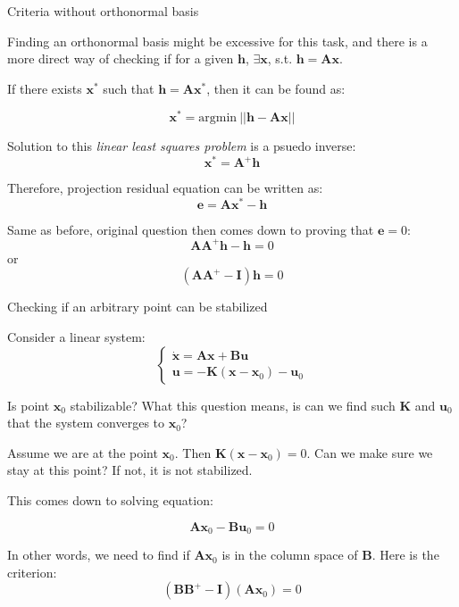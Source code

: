 \documentclass{beamer}
\begin{document}
\begin{frame}{Criteria without orthonormal basis}
\begin{flushleft}

Finding an orthonormal basis might be excessive for this task, and there is a more direct way of checking if for a given $\mathbf h$, $\exists \mathbf x$, s.t.  $\mathbf h = \mathbf A \mathbf x$.

If there exists $\mathbf x^*$ such that $\mathbf h = \mathbf A \mathbf x^*$, then it can be found as:

\[
\mathbf x^* = \text{argmin} \ || \mathbf h - \mathbf A \mathbf x ||
\]

Solution to this \emph{linear least squares problem} is a psuedo inverse:
\[
\mathbf x^* = \mathbf A^+ \mathbf h
\]

Therefore, projection residual equation can be written as:
\[
\mathbf e = \mathbf A \mathbf x^* - \mathbf h
\]

Same as before, original question then comes down to proving that $\mathbf e = 0$:
\[
\mathbf A \mathbf A^+ \mathbf h - \mathbf h = 0
\]
or
\[
(\mathbf A \mathbf A^+ - \mathbf I) \mathbf h  = 0
\]


\end{flushleft}
\end{frame}


\begin{frame}{Checking if an arbitrary point can be stabilized}
\begin{flushleft}

Consider a linear system:
\begin{equation}
\begin{cases}
    \dot{\mathbf x} = \mathbf A \mathbf x + \mathbf B \mathbf u \\
    \mathbf u = -\mathbf K (\mathbf x - \mathbf x_0) - \mathbf u_0
\end{cases}
\end{equation}

Is point $\mathbf x_0$ stabilizable? What this question means, is can we find such $\mathbf K$ and $\mathbf u_0$ that the system converges to $\mathbf x_0$?

\bigskip

Assume we are at the point $\mathbf x_0$. Then $\mathbf K (\mathbf x - \mathbf x_0) = 0$. Can we make sure we stay at this point? If not, it is not stabilized.

This comes down to solving equation:

\[
\mathbf A \mathbf x_0 - \mathbf B \mathbf u_0 = 0
\]

In other words, we need to find if $\mathbf A \mathbf x_0$ is in the column space of $\mathbf B$. Here is the criterion:
\[
(\mathbf B \mathbf B^+ - \mathbf I) (\mathbf A \mathbf x_0)  = 0
\]

\end{flushleft}
\end{frame}
\end{document}
